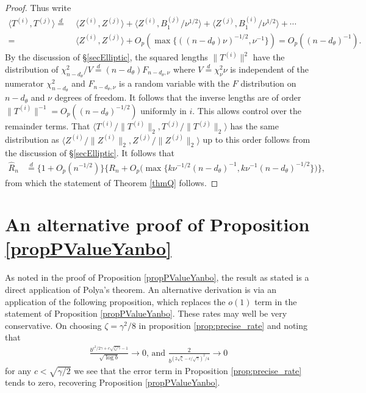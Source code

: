 \documentclass[10pt, reqno]{amsart}
\numberwithin{equation}{section}
\begin{document}
\begin{appendix}
\begin{proof}
	Thus write
	\begin{align*}
		\bigl\langle T^{(i)}, T^{(j)}\bigr\rangle \stackrel{d}{=} & \;\bigl\langle Z^{(i)}, Z^{(j)}\bigr\rangle +  \bigl\langle Z^{(i)}, B_1^{(j)}/\nu^{1/2}\bigr\rangle + \bigl\langle Z^{(j)}, B_1^{(i)}/\nu^{1/2}\bigr\rangle  + \cdots \\
		= & \;\bigl\langle Z^{(i)}, Z^{(j)}\bigr\rangle + O_{p}(\max\{((n-d_\theta)\nu)^{-1/2}, \nu^{-1}\}) = O_p((n-d_\theta)^{-1}).
	\end{align*}
	By the discussion of \S \ref{secElliptic}, the squared lengths $\|T^{(i)}\|^2$ have the distribution of $\chi^2_{n-d_\theta}/V \stackrel{d}{=}(n-d_\theta) F_{n-d_\theta, \nu}$ where $V\stackrel{d}{=}\chi^2_{\nu}\nu$ is independent of the numerator $\chi^2_{n-d_\theta}$ and $F_{n-d_\theta, \nu}$ is a random variable with the $F$ distribution on $n-d_\theta$ and $\nu$ degrees of freedom. It follows that the inverse lengths are of order $\|T^{(i)}\|^{-1}=O_p((n-d_\theta)^{-1/2})$ uniformly in $i$. This allows control over the remainder terms. That $\bigl\langle T^{(i)}/\|T^{(i)}\|_2, T^{(j)}/\|T^{(j)}\|_2\bigr\rangle$ has the same distribution as $\bigl\langle Z^{(i)}/\|Z^{(i)}\|_2, Z^{(j)}/\|Z^{(j)}\|_2\bigr\rangle$ up to this order follows from the discussion of \S \ref{secElliptic}. It follows that
	\begin{align*}
		\hat{R}_n &\stackrel{d}{=} \big\{1 + O_p(n^{-1/2}) \big\} \bigr\{R_n + O_{p}\bigl(\max\bigl\{k\nu^{-1/2}(n-d_\theta)^{-1}, k\nu^{-1}(n-d_\theta)^{-1/2}\bigr\}\bigr) \bigr\}, 
	\end{align*}
	from which the statement of Theorem \ref{thmQ} follows.
\end{proof}	


\section{An alternative proof of Proposition \ref{propPValueYanbo}}\label{appAlternativePolya}

As noted in the proof of Proposition \ref{propPValueYanbo}, the result as stated is a direct application of Polya's theorem. An alternative derivation is via an application of the following proposition, which replaces the $o(1)$ term in the statement of Proposition \ref{propPValueYanbo}. These rates may well be very conservative. On choosing $\zeta = \gamma^2/8$ in proposition \ref{prop:precise_rate} and noting that 
\begin{align*}
	\frac{b^{c^2/2\gamma + c\sqrt{\zeta/\gamma} - 1}}{\sqrt{\log b}} \rightarrow 0 \text{, and } 
	\frac{2}{b^{(2\sqrt{\zeta} - c/\sqrt{\gamma})^2/4}} \rightarrow 0
\end{align*}
for any $c <\sqrt{\gamma/2}$ we see that the error term in Proposition \ref{prop:precise_rate} tends to zero, recovering Proposition \ref{propPValueYanbo}.



\end{appendix}
\end{document}
